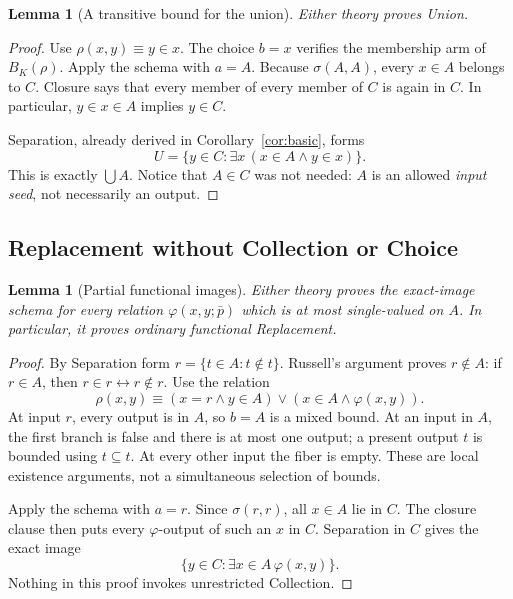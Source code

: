 \documentclass[11pt,letterpaper]{article}
\newtheorem{lemma}[theorem]{Lemma}
\theoremstyle{definition}\newtheorem{definition}[theorem]{Definition}
\theoremstyle{remark}\newtheorem{remark}[theorem]{Remark}
\newcommand{\ps}{\bar p}
\begin{document}
\begin{lemma}[A transitive bound for the union]\label{lem:union}
Either theory proves Union.
\end{lemma}
\begin{proof}
Use $\rho(x,y)\equiv y\in x$. The choice $b=x$ verifies the membership
arm of $B_K(\rho)$. Apply the schema with $a=A$. Because
$\sigma(A,A)$, every $x\in A$ belongs to $C$. Closure says that every
member of every member of $C$ is again in $C$. In particular,
$y\in x\in A$ implies $y\in C$.

Separation, already derived in Corollary~\ref{cor:basic}, forms
\[
 U=\{y\in C:\exists x\,(x\in A\land y\in x)\}.
\]
This is exactly $\bigcup A$. Notice that $A\in C$ was not needed:
$A$ is an allowed \emph{input seed}, not necessarily an output.
\end{proof}

\subsection{Replacement without Collection or Choice}

\begin{lemma}[Partial functional images]\label{lem:replacement}
Either theory proves the exact-image schema for every relation
$\varphi(x,y;\ps)$ which is at most single-valued on $A$.
In particular, it proves ordinary functional Replacement.
\end{lemma}
\begin{proof}
By Separation form
$r=\{t\in A:t\notin t\}$. Russell's argument proves $r\notin A$:
if $r\in A$, then $r\in r\leftrightarrow r\notin r$.
Use the relation
\begin{equation}\label{eq:star}
 \rho(x,y)\equiv
 (x=r\land y\in A)\lor(x\in A\land\varphi(x,y)).
\end{equation}
At input $r$, every output is in $A$, so $b=A$ is a mixed bound.
At an input in $A$, the first branch is false and there is at most one
output; a present output $t$ is bounded using $t\subseteq t$.
At every other input the fiber is empty. These are local existence
arguments, not a simultaneous selection of bounds.

Apply the schema with $a=r$. Since $\sigma(r,r)$, all $x\in A$ lie in
$C$. The closure clause then puts every $\varphi$-output of such an $x$
in $C$. Separation in $C$ gives the exact image
\[
 \{y\in C:\exists x\in A\,\varphi(x,y)\}.
\]
Nothing in this proof invokes unrestricted Collection.
\end{proof}
\end{document}

